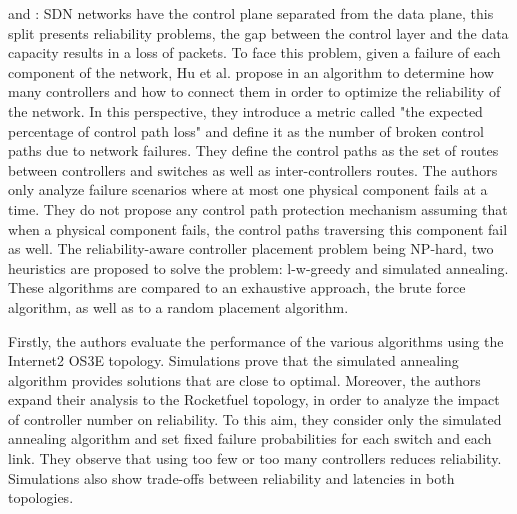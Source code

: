 \documentclass[a4paper,10pt]{article}
\begin{document}
\cite{HuWe13} and \cite{HuWa12}: SDN networks have the control plane separated from the data plane, this split presents reliability problems, the gap between the control layer and the data capacity results in a loss of packets. To face this problem,  given a failure of each component of the network, Hu et al. propose in \cite{HuWa12,HuWe13} an algorithm to determine how many controllers and how to connect them in order to optimize the reliability of the network. In this perspective, they introduce a metric called "the expected percentage of control path loss" and define it  as the number of broken control paths due to network failures. They define the control paths as the set of routes between controllers and switches as well as inter-controllers routes. The authors only analyze failure scenarios where at most one physical component fails at a time. They do not propose any control path protection mechanism assuming that when a physical component fails, the control paths traversing this component fail as well. The reliability-aware controller placement problem being NP-hard, two heuristics are proposed to solve the problem: l-w-greedy and simulated annealing. These algorithms are compared to an exhaustive approach, the brute force algorithm, as well as to a random placement algorithm. 

Firstly, the authors evaluate the performance of the various algorithms using the Internet2 OS3E topology. Simulations prove that the simulated annealing algorithm provides solutions that are close to optimal. Moreover, the authors expand their analysis to the Rocketfuel topology, in order to analyze the impact of controller number on reliability. To this aim, they consider only the simulated annealing algorithm and set fixed failure probabilities for each switch and each link. They observe that using too few or too many controllers reduces reliability. Simulations also show trade-offs between reliability and latencies in both topologies.


\end{document}
